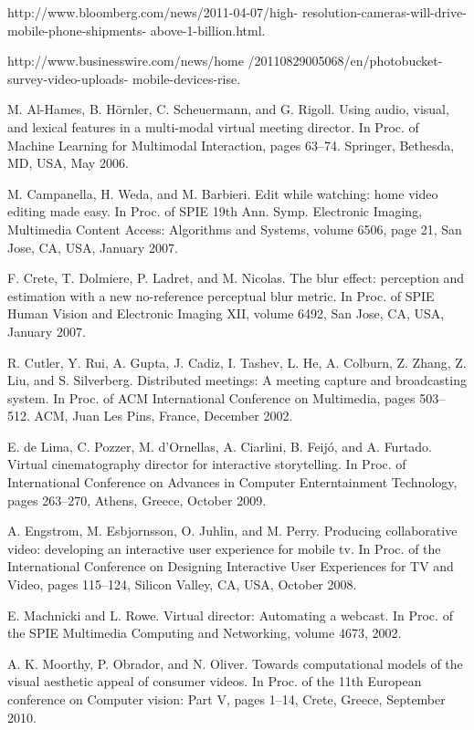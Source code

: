\documentclass{sig-alternate}
\begin{document}
\begin{thebibliography}{21}
http://www.bloomberg.com/news/2011-04-07/high-
resolution-cameras-will-drive-mobile-phone-shipments-
above-1-billion.html.
 
http://www.businesswire.com/news/home
/20110829005068/en/photobucket-survey-video-uploads-
mobile-devices-rise.
 
M. Al-Hames, B. Hörnler, C. Scheuermann, and G. Rigoll.
Using audio, visual, and lexical features in a multi-modal
virtual meeting director. In Proc. of Machine Learning for
Multimodal Interaction, pages 63–74. Springer, Bethesda,
MD, USA, May 2006.

M. Campanella, H. Weda, and M. Barbieri. Edit while
watching: home video editing made easy. In Proc. of SPIE
19th Ann. Symp. Electronic Imaging, Multimedia Content
Access: Algorithms and Systems, volume 6506, page 21, San
Jose, CA, USA, January 2007.
 
F. Crete, T. Dolmiere, P. Ladret, and M. Nicolas. The blur
effect: perception and estimation with a new no-reference
perceptual blur metric. In Proc. of SPIE Human Vision and
Electronic Imaging XII, volume 6492, San Jose, CA, USA,
January 2007.
 
R. Cutler, Y. Rui, A. Gupta, J. Cadiz, I. Tashev, L. He,
A. Colburn, Z. Zhang, Z. Liu, and S. Silverberg. Distributed
meetings: A meeting capture and broadcasting system. In
Proc. of ACM International Conference on Multimedia,
pages 503–512. ACM, Juan Les Pins, France, December
2002.

E. de Lima, C. Pozzer, M. d’Ornellas, A. Ciarlini, B. Feijó,
and A. Furtado. Virtual cinematography director for
interactive storytelling. In Proc. of International Conference
on Advances in Computer Enterntainment Technology, pages
263–270, Athens, Greece, October 2009.
 
A. Engstrom, M. Esbjornsson, O. Juhlin, and M. Perry.
Producing collaborative video: developing an interactive user
experience for mobile tv. In Proc. of the International
Conference on Designing Interactive User Experiences for
TV and Video, pages 115–124, Silicon Valley, CA, USA,
October 2008.
 
E. Machnicki and L. Rowe. Virtual director: Automating a
webcast. In Proc. of the SPIE Multimedia Computing and
Networking, volume 4673, 2002.

A. K. Moorthy, P. Obrador, and N. Oliver. Towards
computational models of the visual aesthetic appeal of
consumer videos. In Proc. of the 11th European conference
on Computer vision: Part V, pages 1–14, Crete, Greece,
September 2010.
 

\end{thebibliography}
\end{document}
